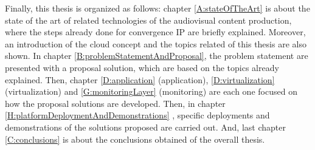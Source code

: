 Finally, this thesis is organized as follows: chapter \ref{A:stateOfTheArt} is about the state of the art of related technologies of the audiovisual content production, where the steps already done for convergence IP are briefly explained. Moreover, an introduction of the cloud concept and the topics related of this thesis are also shown. In chapter \ref{B:problemStatementAndProposal}, the problem statement are presented with a proposal solution, which are based on the topics already explained. Then, chapter \ref{D:application} (application), \ref{D:virtualization} (virtualization) and \ref{G:monitoringLayer} (monitoring) are each one focused on how the proposal solutions are developed. Then, in chapter \ref{H:platformDeploymentAndDemonstrations}
, specific deployments and demonstrations of the solutions proposed are carried out. And, last chapter \ref{C:conclusions} is about the conclusions obtained of the overall thesis.






